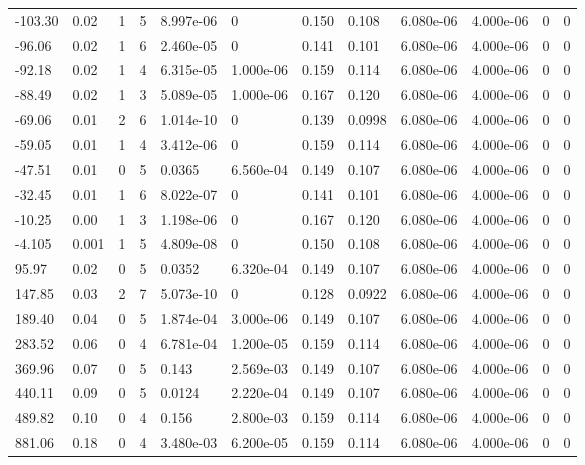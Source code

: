 \documentclass[preview]{standalone}
\begin{document}
{{\begin{tabular}{L{1.2cm}C{1.2cm} C{0.3cm}C{0.5cm} C{1.4cm}C{1.4cm} C{1.4cm}C{1.4cm} C{1.6cm}C{1.6cm} C{1.6cm}C{1.6cm}}
  -103.30  &  0.02  & 1     &  5 &  8.997e-06  & 0  &  0.150&   0.108& 6.080e-06 & 4.000e-06   &  0 & 0  \\ 
  -96.06  &  0.02  & 1     &  6 &  2.460e-05  & 0  &  0.141&   0.101& 6.080e-06 & 4.000e-06   &  0 & 0  \\ 
  -92.18  &  0.02  & 1     &  4 &  6.315e-05  & 1.000e-06  &  0.159&   0.114& 6.080e-06 & 4.000e-06   &  0 & 0  \\ 
  -88.49  &  0.02  & 1     &  3 &  5.089e-05  & 1.000e-06  &  0.167&   0.120& 6.080e-06 & 4.000e-06   &  0 & 0  \\ 
  -69.06  &  0.01  & 2     &  6 &  1.014e-10  & 0  &  0.139&   0.0998& 6.080e-06 & 4.000e-06   &  0 & 0  \\ 
  -59.05  &  0.01  & 1     &  4 &  3.412e-06  & 0  &  0.159&   0.114& 6.080e-06 & 4.000e-06   &  0 & 0  \\ 
  -47.51  &  0.01  & 0     &  5 &  0.0365  & 6.560e-04  &  0.149&   0.107& 6.080e-06 & 4.000e-06   &  0 & 0  \\ 
  -32.45  &  0.01  & 1     &  6 &  8.022e-07  & 0  &  0.141&   0.101& 6.080e-06 & 4.000e-06   &  0 & 0  \\ 
  -10.25  &  0.00  & 1     &  3 &  1.198e-06  & 0  &  0.167&   0.120& 6.080e-06 & 4.000e-06   &  0 & 0  \\ 
  -4.105  &  0.001  & 1     &  5 &  4.809e-08  & 0  &  0.150&   0.108& 6.080e-06 & 4.000e-06   &  0 & 0  \\ 
  95.97  &  0.02  & 0     &  5 &  0.0352  & 6.320e-04  &  0.149&   0.107& 6.080e-06 & 4.000e-06   &  0 & 0  \\ 
  147.85  &  0.03  & 2     &  7 &  5.073e-10  & 0  &  0.128&   0.0922& 6.080e-06 & 4.000e-06   &  0 & 0  \\ 
  189.40  &  0.04  & 0     &  5 &  1.874e-04  & 3.000e-06  &  0.149&   0.107& 6.080e-06 & 4.000e-06   &  0 & 0  \\ 
  283.52  &  0.06  & 0     &  4 &  6.781e-04  & 1.200e-05  &  0.159&   0.114& 6.080e-06 & 4.000e-06   &  0 & 0  \\ 
  369.96  &  0.07  & 0     &  5 &  0.143  & 2.569e-03  &  0.149&   0.107& 6.080e-06 & 4.000e-06   &  0 & 0  \\ 
  440.11  &  0.09  & 0     &  5 &  0.0124  & 2.220e-04  &  0.149&   0.107& 6.080e-06 & 4.000e-06   &  0 & 0  \\ 
  489.82  &  0.10  & 0     &  4 &  0.156  & 2.800e-03  &  0.159&   0.114& 6.080e-06 & 4.000e-06   &  0 & 0  \\ 
  881.06  &  0.18  & 0     &  4 &  3.480e-03  & 6.200e-05  &  0.159&   0.114& 6.080e-06 & 4.000e-06   &  0 & 0  \\ 

\end{tabular}}}
\end{document}
